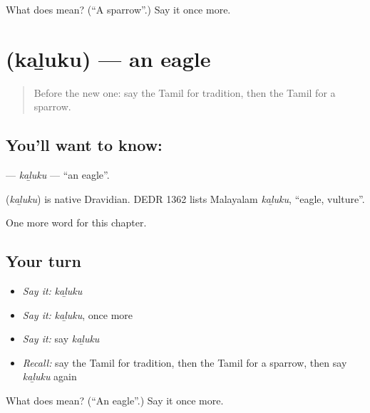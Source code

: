 \begin{tcolorbox}[breakable,colback=teal!4,colframe=teal!35!black,title={Before you move on}]
What does  mean? (\textquotedblleft{}A sparrow\textquotedblright{}.) Say it once more.
\end{tcolorbox}
\section[\texorpdfstring{\ta{கழுகு} (kaḻuku)}{கழுகு (kaḻuku)}]{ (kaḻuku) — an eagle}

\label{lesson:TA-C247-kaluku}



\begin{quote}
Before the new one: say the Tamil for tradition, then the Tamil for a sparrow.
\end{quote}

\subsection*{You'll want to know: }
\textbf{} — \emph{kaḻuku} — \textquotedblleft{}an eagle\textquotedblright{}.

\begin{cousinweb}
\textbf{} (\emph{kaḻuku}) is native Dravidian. DEDR 1362 lists Malayalam \emph{kaḻuku}, \textquotedblleft{}eagle, vulture\textquotedblright{}.
\end{cousinweb}

\begin{grammarlens}[title={What you've built}]
One more word for this chapter.
\end{grammarlens}

\subsection*{Your turn}
\begin{itemize}
\raggedright
  \item \emph{Say it:} \emph{kaḻuku}
  \item \emph{Say it:} \emph{kaḻuku}, once more
  \item \emph{Say it:} say \emph{kaḻuku}
  \item \emph{Recall:} say the Tamil for tradition, then the Tamil for a sparrow, then say \emph{kaḻuku} again
\end{itemize}

\begin{tcolorbox}[breakable,colback=teal!4,colframe=teal!35!black,title={Before you move on}]
What does  mean? (\textquotedblleft{}An eagle\textquotedblright{}.) Say it once more.
\end{tcolorbox}
